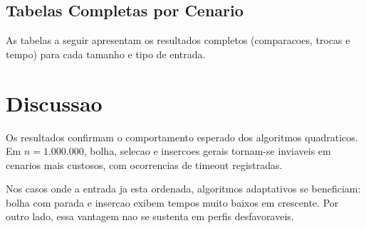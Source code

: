\documentclass[12pt]{article}
\begin{document}
\subsection{Tabelas Completas por Cenario}
As tabelas a seguir apresentam os resultados completos (comparacoes, trocas e tempo)
para cada tamanho e tipo de entrada.

\begin{table}[ht]
\centering
\caption{Resultados para $n=10.000$ com entrada aleatoria.}
\label{tab:10000a}

\end{table}

\begin{table}[ht]
\centering
\caption{Resultados para $n=10.000$ com entrada crescente.}
\label{tab:10000c}

\end{table}

\begin{table}[ht]
\centering
\caption{Resultados para $n=10.000$ com entrada decrescente.}
\label{tab:10000d}

\end{table}

\begin{table}[ht]
\centering
\caption{Resultados para $n=1.000.000$ com entrada aleatoria.}
\label{tab:1000000a}

\end{table}

\begin{table}[ht]
\centering
\caption{Resultados para $n=1.000.000$ com entrada crescente.}
\label{tab:1000000c}

\end{table}

\begin{table}[ht]
\centering
\caption{Resultados para $n=1.000.000$ com entrada decrescente.}
\label{tab:1000000d}

\end{table}

\section{Discussao}
Os resultados confirmam o comportamento esperado dos algoritmos quadraticos.
Em $n=1.000.000$, bolha, selecao e insercoes gerais tornam-se inviaveis em
cenarios mais custosos, com ocorrencias de timeout registradas.

Nos casos onde a entrada ja esta ordenada, algoritmos adaptativos se beneficiam:
bolha com parada e insercao exibem tempos muito baixos em crescente.
Por outro lado, essa vantagem nao se sustenta em perfis desfavoraveis.
\end{document}
